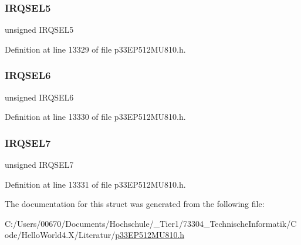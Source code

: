 \subsubsection{\texorpdfstring{I\+R\+Q\+S\+E\+L5}{IRQSEL5}}
{\footnotesize\ttfamily unsigned I\+R\+Q\+S\+E\+L5}



Definition at line 13329 of file p33\+E\+P512\+M\+U810.\+h.

\mbox{\label{structtag_d_m_a9_r_e_q_b_i_t_s_ace52408ef8c29561f3c56a3fbcbc8217}} 
\subsubsection{\texorpdfstring{I\+R\+Q\+S\+E\+L6}{IRQSEL6}}
{\footnotesize\ttfamily unsigned I\+R\+Q\+S\+E\+L6}



Definition at line 13330 of file p33\+E\+P512\+M\+U810.\+h.

\mbox{\label{structtag_d_m_a9_r_e_q_b_i_t_s_acce7dedecdf1f53cdbead3edf7c5d53a}} 
\subsubsection{\texorpdfstring{I\+R\+Q\+S\+E\+L7}{IRQSEL7}}
{\footnotesize\ttfamily unsigned I\+R\+Q\+S\+E\+L7}



Definition at line 13331 of file p33\+E\+P512\+M\+U810.\+h.



The documentation for this struct was generated from the following file\+:\begin{DoxyCompactItemize}
\item 
C\+:/\+Users/00670/\+Documents/\+Hochschule/\+\_\+\+Tier1/73304\+\_\+\+Technische\+Informatik/\+Code/\+Hello\+World4.\+X/\+Literatur/\hyperlink{p33_e_p512_m_u810_8h}{p33\+E\+P512\+M\+U810.\+h}\end{DoxyCompactItemize}
